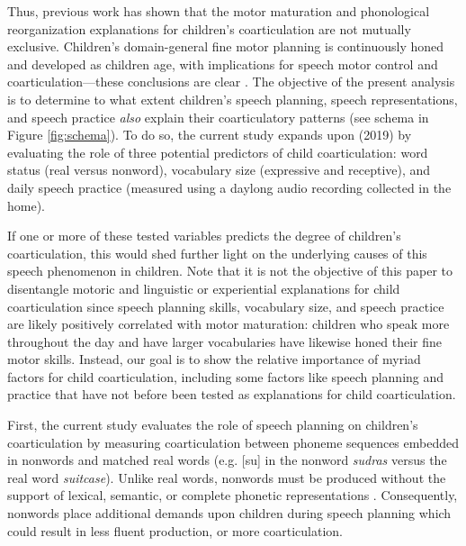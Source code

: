 \documentclass[a4paper,man,natbib,donotrepeattitle, apacite]{apa6}
\begin{document}
Thus, previous work has shown that the motor maturation and phonological reorganization explanations for children’s coarticulation are not mutually exclusive. Children’s domain-general fine motor planning is continuously honed and developed as children age, with implications for speech motor control and coarticulation---these conclusions are clear \cite{barbierWhatAnticipatoryCoarticulation2020,rubertusDevelopmentGesturalOrganization2018,zharkovaUltrasoundStudyDevelopment2018}. The objective of the present analysis is to determine to what extent children’s speech planning, speech representations, and speech practice \textit{also} explain their coarticulatory patterns (see schema in Figure \ref{fig:schema}). To do so, the current study expands upon \citeauthor{noiraySpokenLanguageDevelopment2019} (2019) by evaluating the role of three potential predictors of child coarticulation: word status (real versus nonword), vocabulary size (expressive and receptive), and daily speech practice (measured using a daylong audio recording collected in the home).

If one or more of these tested variables predicts the degree of children’s coarticulation, this would shed further light on the underlying causes of this speech phenomenon in children. Note that it is not the objective of this paper to disentangle motoric and linguistic or experiential explanations for child coarticulation since speech planning skills, vocabulary size, and speech practice are likely positively correlated with motor maturation: children who speak more throughout the day and have larger vocabularies have likewise honed their fine motor skills. Instead, our goal is to show the relative importance of myriad factors for child coarticulation, including some factors like speech planning and practice that have not before been tested as explanations for child coarticulation. 

First, the current study evaluates the role of speech planning on children’s coarticulation by measuring coarticulation between phoneme sequences embedded in nonwords and matched real words (e.g. [su] in the nonword \textit{sudras} versus the real word \textit{suitcase}). Unlike real words, nonwords must be produced without the support of lexical, semantic, or complete phonetic representations \cite{chiatPreschoolRepetitionTest2007,cychoszLexicalAdvantageFouryearold2020,gathercoleInfluencesNumberSyllables1991,keren-portnoyRoleVocalPractice2010}. Consequently, nonwords place additional demands upon children during speech planning which could result in less fluent production, or more coarticulation.
\end{document}
